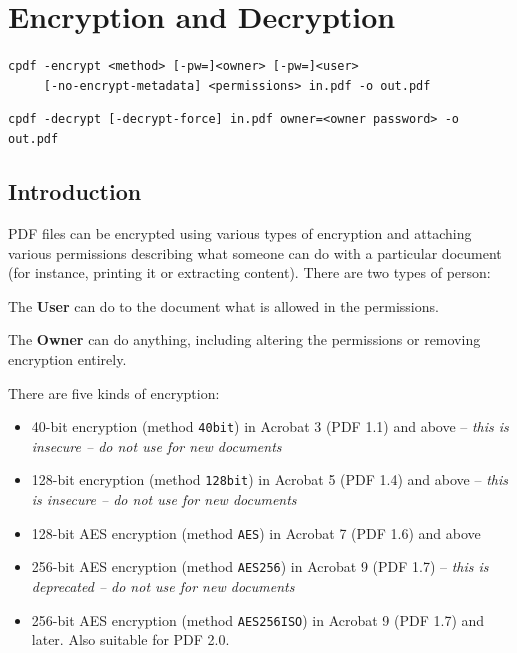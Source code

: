 \documentclass{book}
\begin{document}
\chapter{Encryption and Decryption}\label{chap:4}
\pagestyle{fancy}
\label{encryption}

  \begin{framed}
    \small\noindent\verb!cpdf -encrypt <method> [-pw=]<owner> [-pw=]<user>!\\
    \noindent\verb!     [-no-encrypt-metadata] <permissions> in.pdf -o out.pdf!

    \vspace{1.5mm}
    \noindent\verb!cpdf -decrypt [-decrypt-force] in.pdf owner=<owner password> -o out.pdf!
  \end{framed}

  \label{crypt}
  \section{Introduction}
  PDF files can be encrypted using various types of encryption and attaching
various permissions describing what someone can do with a particular document
(for instance, printing it or extracting content). There are two types of
person:
  \begin{description}
    \item The \textbf{User} can do to the document what is allowed in the permissions.
    \item The \textbf{Owner} can do anything, including altering the permissions or removing encryption entirely.
  \end{description}
  There are five kinds of encryption:
  \begin{itemize}
  \item 40-bit encryption (method \texttt{40bit}) in Acrobat 3 (PDF 1.1) and above -- \textit{this is insecure -- do not use for new documents} 
  \item 128-bit encryption (method \texttt{128bit}) in Acrobat 5 (PDF 1.4) and above -- \textit{this is insecure -- do not use for new documents}
  \item 128-bit AES encryption (method \texttt{AES}) in Acrobat 7 (PDF 1.6) and above
  \item 256-bit AES encryption (method \texttt{AES256}) in Acrobat 9 (PDF 1.7) -- \textit{this is deprecated -- do not use for new documents}
  \item 256-bit AES encryption (method \texttt{AES256ISO}) in Acrobat 9 (PDF 1.7) and later. Also suitable for PDF 2.0.
  \end{itemize}
\end{document}
